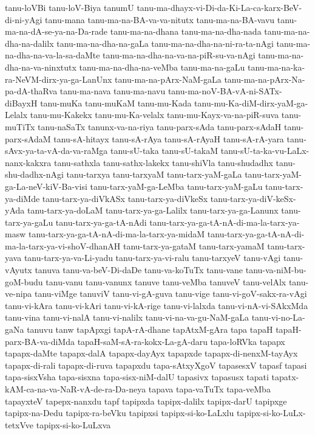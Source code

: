 {tanu-loVBi
tanu-loV-Biya
tanumU
tanu-ma-dhayx-vi-Di-da-Ki-La-ca-karx-BeV-di-ni-yAgi
tanu-mana
tanu-ma-na-BA-va-va-nitutx
tanu-ma-na-BA-vavu
tanu-ma-na-dA-se-ya-na-Da-rade
tanu-ma-na-dhana
tanu-ma-na-dha-nada
tanu-ma-na-dha-na-dalilx
tanu-ma-na-dha-na-gaLa
tanu-ma-na-dha-na-ni-ra-ta-nAgi
tanu-ma-na-dha-na-va-la-sa-daMte
tanu-ma-na-dha-na-va-na-piR-su-va-nAgi
tanu-ma-na-dha-na-va-ninxtutx
tanu-ma-na-dha-na-veMba
tanu-ma-na-gaLu
tanu-ma-na-ka-ra-NeVM-dirx-ya-ga-LanUnx
tanu-ma-na-pArx-NaM-gaLa
tanu-ma-na-pArx-Na-pa-dA-thaRva
tanu-ma-nava
tanu-ma-navu
tanu-ma-noV-BA-vA-ni-SATx-diBayxH
tanu-muKa
tanu-muKaM
tanu-mu-Kada
tanu-mu-Ka-diM-dirx-yaM-ga-Lelalx
tanu-mu-Kakekx
tanu-mu-Ka-velalx
tanu-mu-Kayx-va-na-piR-suva
tanu-muTiTx
tanu-naSaTx
tanunx-va-na-riya
tanu-parx-sAda
tanu-parx-sAdaH
tanu-parx-sAdaM
tanu-sA-hitayx
tanu-sA-rAya
tanu-sA-rAyaH
tanu-sA-rA-yara
tanu-sAvx-ya-ta-vA-da-va-raMga
tanu-sU-taka
tanu-sU-takaM
tanu-sU-ta-ka-vu-LaLx-nanx-kakxra
tanu-sathxla
tanu-sathx-lakekx
tanu-shiVla
tanu-shudadhx
tanu-shu-dadhx-nAgi
tanu-tarxya
tanu-tarxyaM
tanu-tarx-yaM-gaLa
tanu-tarx-yaM-ga-La-neV-kiV-Ba-visi
tanu-tarx-yaM-ga-LeMba
tanu-tarx-yaM-gaLu
tanu-tarx-ya-diMde
tanu-tarx-ya-diVkASx
tanu-tarx-ya-diVkeSx
tanu-tarx-ya-diV-keSx-yAda
tanu-tarx-ya-doLaM
tanu-tarx-ya-ga-Lalilx
tanu-tarx-ya-ga-Lanunx
tanu-tarx-ya-gaLu
tanu-tarx-ya-ga-tA-nAdi
tanu-tarx-ya-ga-tA-nA-di-ma-la-tarx-ya-masw
tanu-tarx-ya-ga-tA-nA-di-ma-la-tarx-ya-midaM
tanu-tarx-ya-ga-tA-nA-di-ma-la-tarx-ya-vi-shoV-dhanAH
tanu-tarx-ya-gataM
tanu-tarx-yamaM
tanu-tarx-yava
tanu-tarx-ya-va-Li-yadu
tanu-tarx-ya-vi-ralu
tanu-tarxyeV
tanu-vAgi
tanu-vAyutx
tanuva
tanu-va-beV-Di-daDe
tanu-va-koTuTx
tanu-vane
tanu-va-niM-bu-goM-budu
tanu-vanu
tanu-vanunx
tanuve
tanu-veMba
tanuveV
tanu-velAlx
tanu-ve-nipa
tanu-viMge
tanuviV
tanu-vi-gA-guva
tanu-vige
tanu-vi-goV-sakx-ra-vAgi
tanu-vi-kAra
tanu-vi-kAri
tanu-vi-kA-rige
tanu-vi-lalxda
tanu-vi-nA-vi-SAkxMda
tanu-vina
tanu-vi-nalA
tanu-vi-nalilx
tanu-vi-na-va-gu-NaM-gaLa
tanu-vi-no-La-gaNa
tanuvu
tanw
tapApxgi
tapA-rA-dhane
tapAtxM-gAra
tapa
tapaH
tapaH-parx-BA-va-diMda
tapaH-saM-sA-ra-kokx-La-gA-daru
tapa-loRVka
tapapx
tapapx-daMte
tapapx-dalA
tapapx-dayAyx
tapapxde
tapapx-di-nenxM-tayAyx
tapapx-di-rali
tapapx-di-ruva
tapapxdu
tapa-sAtxyXgoV
tapasesxV
tapasf
tapasi
tapa-sisxVsha
tapa-sisxna
tapa-sisx-niM-dalU
tapasivx
tapasusx
tapati
tapatx-kAM-ca-na-va-NaR-vA-de-ra-Da-neya
tapava
tapa-vaTuTx
tapa-veMba
tapayxteV
tapepx-nanxdu
tapf
tapipxda
tapipx-dalilx
tapipx-darU
tapipxge
tapipx-na-Dedu
tapipx-ra-beVku
tapipxsi
tapipx-si-ko-LaLxlu
tapipx-si-ko-LuLx-tetxVve
tapipx-si-ko-LuLxva
}
